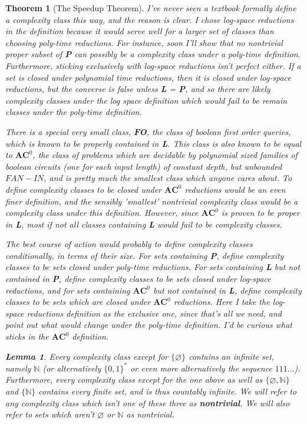 \documentclass{article}
\theoremstyle{definition}
\theoremstyle{plain}
\theoremstyle{theorem}
\newtheorem{lemma}{Lemma}[section]
\newtheorem{theorem}{Theorem}[section]
\begin{document}
\begin{theorem}[The Speedup Theorem]
\par I've never seen a textbook formally define a complexity class this way, and the reason is clear. I chose log-space reductions in the definition because it would serve well for a larger set of classes than choosing poly-time reductions. For instance, soon I'll show that no nontrivial proper subset of \textbf{P} can possibly be a complexity class under a poly-time definition. Furthermore, sticking exclusively with log-space reductions isn't perfect either. If a set is closed under polynomial time reductions, then it is closed under log-space reductions, but the converse is false unless \textbf{L} = \textbf{P}, and so there are likely complexity classes under the log space definition which would fail to be remain classes under the poly-time definition. 
\par There is a special very small class, \textbf{FO}, the class of boolean first order queries, which is known to be properly contained in \textbf{L}. This class is also known to be equal to $\textbf{AC}^0$, the class of problems which are decidable by polynomial sized families of boolean circuits (one for each input length) of constant depth, but unbounded $FAN-IN$, and is pretty much the smallest class which anyone cares about. To define complexity classes to be closed under $\textbf{AC}^0$ reductions would be an even finer definition, and the sensibly 'smallest' nontrivial complexity class would be a complexity class under this definition. However, since $\textbf{AC}^0$ is proven to be proper in \textbf{L}, most if not all classes containing \textbf{L} would fail to be complexity classes.
\par The best course of action would probably to define complexity classes conditionally, in terms of their size. For sets containing \textbf{P}, define complexity classes to be sets closed under poly-time reductions. For sets containing \textbf{L} but not contained in \textbf{P}, define complexity classes to be sets closed under log-space reductions, and for sets containing $\textbf{AC}^0$ but not contained in \textbf{L}, define complexity classes to be sets which are closed under $\textbf{AC}^0$ reductions. Here I take the log-space reductions definition as the exclusive one, since that's all we need, and point out what would change under the poly-time definition. I'd be curious what sticks in the $\textbf{AC}^0$ definition.
\begin{lemma}
	Every complexity class except for $\{\varnothing\}$ contains an infinite set, namely $\mathbb{N}$ (or alternatively $\{0,1\}^*$ or even more alternatively the sequence $111\ldots$). Furthermore, every complexity class except for the one above as well as $\{\varnothing,\mathbb{N}\}$ and $\{\mathbb{N}\}$ contains every finite set, and is thus countably infinite. We will refer to any complexity class which isn't one of these three as \textbf{nontrivial}. We will also refer to sets which aren't $\varnothing$ or $\mathbb{N}$ as nontrivial.

\end{lemma}
\end{theorem}
\end{document}
